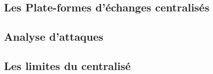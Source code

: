 \subsection{Les Plate-formes d'échanges centralisés}


\subsection{Analyse d'attaques}


\subsection{Les limites du centralisé}
